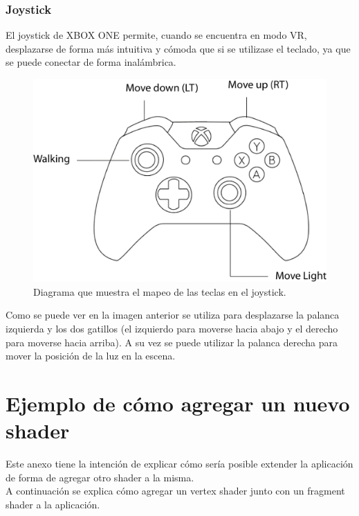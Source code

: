 \documentclass[12pt]{article}
\begin{document}
\subsubsection{Joystick}
El joystick de XBOX ONE permite, cuando se encuentra en modo VR, desplazarse de forma más intuitiva y cómoda que si se utilizase el teclado, ya que se puede conectar de forma inalámbrica.\\
\clearpage
\begin{figure}[h]
\includegraphics[width=0.8\linewidth]{joystick.png}
\caption{Diagrama que muestra el mapeo de las teclas en el joystick.}
\end{figure}
Como se puede ver en la imagen anterior se utiliza para desplazarse la palanca izquierda y los dos gatillos (el izquierdo para moverse hacia abajo y el derecho para moverse hacia arriba). A su vez se puede utilizar la palanca derecha para mover la posición de la luz en la escena.
\clearpage
\section{Ejemplo de cómo agregar un nuevo shader}
Este anexo tiene la intención de explicar cómo sería posible extender la aplicación de forma de agregar otro shader a la misma.
\\A continuación se explica cómo agregar un vertex shader junto con un fragment shader a la aplicación.
\end{document}
